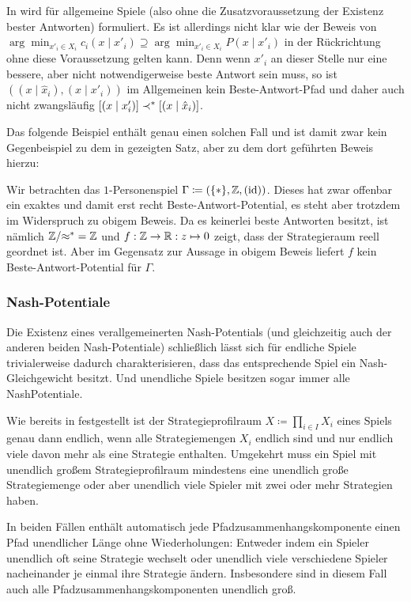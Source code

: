 \begin{bem}
	In \cite{BestRespPot} wird  für allgemeine Spiele (also ohne die Zusatzvoraussetzung der Existenz bester Antworten) formuliert. Es ist allerdings nicht klar wie der Beweis von $\arg \min_{x'_i \in X_i}c_i(x \mid x'_i) \supseteq \arg \min_{x'_i \in X_i} P(x \mid x'_i)$ in der Rückrichtung ohne diese Voraussetzung gelten kann. Denn wenn $x'_i$ an dieser Stelle nur eine bessere, aber nicht notwendigerweise beste Antwort sein muss, so ist $((x \mid \hat{x}_i), (x \mid x'_i))$ im Allgemeinen kein Beste-Antwort-Pfad und daher auch nicht zwangsläufig $[(x \mid x'_i)] \prec^\ast [(x \mid \hat{x}_i)]$.
\end{bem}
Das folgende Beispiel enthält genau einen solchen Fall und ist damit zwar kein Gegenbeispiel zu dem in \cite{BestRespPot} gezeigten Satz, aber zu dem dort geführten Beweis hierzu:

\begin{bsp}
	Wir betrachten das $1$-Personenspiel $\Gamma \coloneqq (\{\ast\}, \mathbb{Z}, (\mathrm{id}))$. Dieses hat zwar offenbar ein exaktes und damit erst recht Beste-Antwort-Potential, es steht aber trotzdem im Widerspruch zu obigem Beweis. Da es keinerlei beste Antworten besitzt, ist nämlich $\mathbb{Z}/{\approx^\ast} = \mathbb{Z}$ und $f: \mathbb{Z} \to \mathbb{R}: z \mapsto 0$ zeigt, dass der Strategieraum reell geordnet ist. Aber im Gegensatz zur Aussage in obigem Beweis liefert $f$ kein Beste-Antwort-Potential für $\Gamma$.
\end{bsp}


\subsubsection{Nash-Potentiale}

Die Existenz eines verallgemeinerten Nash-Potentials (und gleichzeitig auch der anderen beiden Nash-Potentiale) schließlich lässt sich für endliche Spiele trivialerweise dadurch charakterisieren, dass das entsprechende Spiel ein Nash-Gleichgewicht besitzt. Und unendliche Spiele besitzen sogar immer alle NashPotentiale.

\begin{beob}\label{beob:UnendlichePfadzshkomp}
	Wie bereits in  festgestellt ist der Strategieprofilraum $X \coloneqq \prod_{i \in I}X_i$ eines Spiels genau dann endlich, wenn alle Strategiemengen $X_i$ endlich sind und nur endlich viele davon mehr als eine Strategie enthalten. Umgekehrt muss ein Spiel mit unendlich großem Strategieprofilraum mindestens eine unendlich große Strategiemenge oder aber unendlich viele Spieler mit zwei oder mehr Strategien haben.
	
	In beiden Fällen enthält automatisch jede Pfadzusammenhangskomponente einen Pfad unendlicher Länge ohne Wiederholungen: Entweder indem ein Spieler unendlich oft seine Strategie wechselt oder unendlich viele verschiedene Spieler nacheinander je einmal ihre Strategie ändern. Insbesondere sind in diesem Fall auch alle Pfadzusammenhangskomponenten unendlich groß.
\end{beob}

